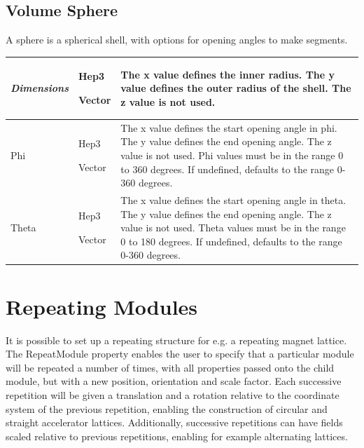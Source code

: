 \subsection{Volume Sphere}
A sphere is a spherical shell, with options for opening angles to make segments.

\begin{center}
\tabletail{}
\tablelasttail{}
\begin{supertabular}{|m{3.89cm}|m{1.333cm}|m{11.772cm}|}
\hline
{\itshape Dimensions} &
Hep3

Vector &
The x value defines the inner radius. The y value defines the outer radius of the shell. The z value is not
used.\\\hline
Phi &
Hep3

Vector &
The x value defines the start opening angle in phi. The y value defines the end opening angle. The z value is not used.
Phi values must be in the range 0 to 360 degrees. If undefined, defaults to the range 0-360 degrees.\\\hline
Theta &
Hep3

Vector &
The x value defines the start opening angle in theta. The y value defines the end opening angle. The z value is not
used. Theta values must be in the range 0 to 180 degrees. If undefined, defaults to the range 0-360 degrees.\\\hline
\end{supertabular}
\end{center}

\section{Repeating Modules}
It is possible to set up a repeating structure for e.g. a repeating magnet lattice. The RepeatModule property enables
the user to specify that a particular module will be repeated a number of times, with all properties passed onto the
child module, but with a new position, orientation and scale factor. Each successive repetition will be given a
translation and a rotation relative to the coordinate system of the previous repetition, enabling the construction of
circular and straight accelerator lattices. Additionally, successive repetitions can have fields scaled relative to
previous repetitions, enabling for example alternating lattices.

